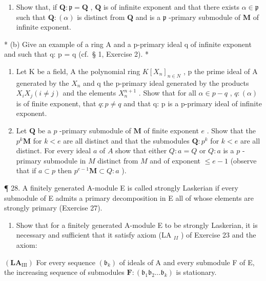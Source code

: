 \begin{enumerate}
\def\labelenumi{(\alph{enumi})}
\tightlist
\item
  Show that, if \(\mathbf{Q} \colon \mathfrak{p} = \mathbf{Q}\) , \(\mathbf{Q}\) is of infinite exponent and that there exists \(\alpha \in \mathfrak{p}\) such that \(\mathbf{Q} \colon (\alpha)\) is distinct from \(\mathbf{Q}\) and is a \(\mathfrak{p}\) -primary submodule of \(\mathbf{M}\) of infinite exponent.
\end{enumerate}

* (b) Give an example of a ring A and a p-primary ideal q of infinite exponent and such that q: p = q (cf.~§ 1, Exercise 2). *

\begin{enumerate}
\def\labelenumi{(\alph{enumi})}
\setcounter{enumi}{2}
\item
  Let K be a field, A the polynomial ring \(K[X_{n}]_{n \in N}\) , p the prime ideal of A generated by the \(X_{n}\) and q the p-primary ideal generated by the products \(X_{i}X_{j} (i \neq j)\) and the elements \(X_{n}^{n+1}\) . Show that for all \(\alpha \in p - q\) , \(q: (\alpha)\) is of finite exponent, that \(q: p \neq q\) and that q: p is a p-primary ideal of infinite exponent.
\item
  Let \(\mathbf{Q}\) be a \(p\) -primary submodule of \(\mathbf{M}\) of finite exponent \(e\) . Show that the \(p^k\mathbf{M}\) for \(k < e\) are all distinct and that the submodules \(\mathbf{Q}: p^k\) for \(k < e\) are all distinct. For every ideal \(a\) of \(A\) show that either \(Q: a = Q\) or \(Q: a\) is a \(p\) -primary submodule in \(M\) distinct from \(M\) and of exponent \(\leqslant e - 1\) (observe that if \(a \subset p\) then \(p^{e-1}\mathbf{M} \subset Q: a\) ).
\end{enumerate}

¶ 28. A finitely generated A-module E is called strongly Laskerian if every submodule of E admits a primary decomposition in E all of whose elements are strongly primary (Exercise 27).

\begin{enumerate}
\def\labelenumi{(\alph{enumi})}
\tightlist
\item
  Show that for a finitely generated A-module E to be strongly Laskerian, it is necessary and sufficient that it satisfy axiom (LA \(_{II}\) ) of Exercise 23 and the axiom:
\end{enumerate}

\((\mathbf{L}\mathbf{A}_{\mathrm{III}})\) For every sequence \((\mathfrak{b}_k)\) of ideals of A and every submodule F of E, the increasing sequence of submodules \(\mathbf{F}:(\mathfrak{b}_1\mathfrak{b}_2\dots \mathfrak{b}_k)\) is stationary.

